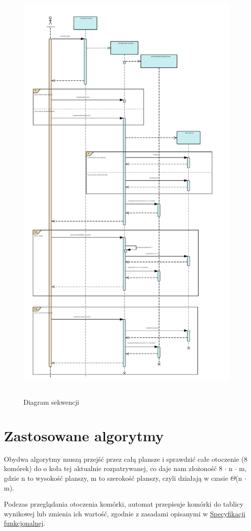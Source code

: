 \documentclass{report}
\begin{document}
\begin{figure}
	\centering
	\includegraphics[height=22cm]{Diagram_Sekwencji_Narysowanie_automatu_ww_symulacja_kilku_stanow}
	\caption{Diagram sekwencji}
	\label{fig:baisicWWSequense}
\end{figure}

\section{Zastosowane algorytmy}
\begin{samepage}
	Obydwa algorytmy muszą przejść przez całą plansze i sprawdzić całe otoczenie (8 komórek) do o koła tej aktualnie rozpatrywanej, co daje nam złożoność 8 $\cdot$ n $\cdot$ m, gdzie n to wysokość planszy, m to szerokość planszy, czyli działają w czasie $\Theta$(n $\cdot$ m).

	Podczas przeglądania otoczenia komórki, automat przepisuje komórki do tablicy wynikowej lub zmienia ich wartość, zgodnie z zasadami opisanymi w \href{https://github.com/boguszj/Wire-world/blob/master/Specyfikacja-funkcjonalna/Specyfikacja-funkcjonalna.pdf}{Specyfikacji funkcjonalnej}.
\end{samepage}
\end{document}
